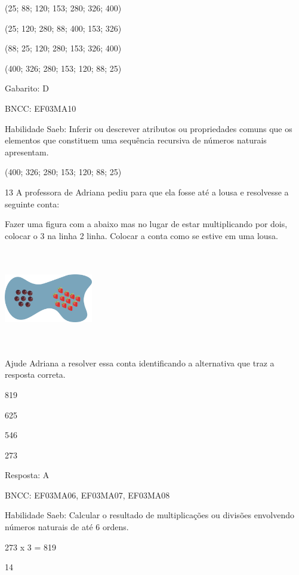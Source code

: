 \begin{escolha}
{\begin{escolha}
{\begin{escolha}
\item
  (25; 88; 120; 153; 280; 326; 400)
\item
  (25; 120; 280; 88; 400; 153; 326)
\item
  (88; 25; 120; 280; 153; 326; 400)
\item
  (400; 326; 280; 153; 120; 88; 25)
\end{escolha}

Gabarito: D

BNCC: EF03MA10

Habilidade Saeb: Inferir ou descrever atributos ou propriedades comuns
que os elementos que constituem uma sequência recursiva de números
naturais apresentam.

(400; 326; 280; 153; 120; 88; 25)

\num{13} A professora de Adriana pediu para que ela fosse até a lousa e
resolvesse a seguinte conta:

Fazer uma figura com a abaixo mas no lugar de estar multiplicando por
dois, colocar o 3 na linha 2 linha. Colocar a conta como se estive em
uma lousa.

\includegraphics[width=1.51680in,height=1.67515in]{media/image114.png}

Ajude Adriana a resolver essa conta identificando a alternativa que traz
a resposta correta.

\begin{escolha}
\item
  819
\item
  625
\item
  546
\item
  273
\end{escolha}

Resposta: A

BNCC: EF03MA06, EF03MA07, EF03MA08

Habilidade Saeb: Calcular o resultado de multiplicações ou divisões
envolvendo números naturais de até 6 ordens.

273 x 3 = 819

\num{14}

}
\end{escolha}}
\end{escolha}
